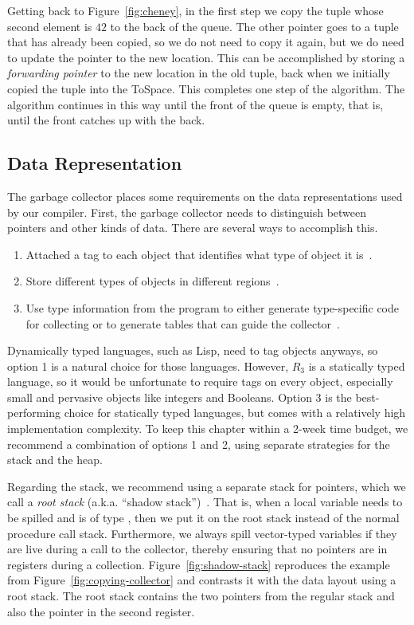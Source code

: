 \documentclass[11pt]{book}
\begin{document}
Getting back to Figure~\ref{fig:cheney}, in the first step we copy the
tuple whose second element is $42$ to the back of the queue. The other
pointer goes to a tuple that has already been copied, so we do not
need to copy it again, but we do need to update the pointer to the new
location. This can be accomplished by storing a \emph{forwarding
pointer} to the new location in the old tuple, back when we initially
copied the tuple into the ToSpace. This completes one step of the
algorithm. The algorithm continues in this way until the front of the
queue is empty, that is, until the front catches up with the back.


\subsection{Data Representation}
\label{sec:data-rep-gc}

The garbage collector places some requirements on the data
representations used by our compiler. First, the garbage collector
needs to distinguish between pointers and other kinds of data. There
are several ways to accomplish this.
\begin{enumerate}
\item Attached a tag to each object that identifies what type of
  object it is~\citep{McCarthy:1960dz}.
\item Store different types of objects in different
  regions~\citep{Steele:1977ab}.
\item Use type information from the program to either generate
  type-specific code for collecting or to generate tables that can
  guide the
  collector~\citep{Appel:1989aa,Goldberg:1991aa,Diwan:1992aa}.
\end{enumerate}
Dynamically typed languages, such as Lisp, need to tag objects
anyways, so option 1 is a natural choice for those languages.
However, $R_3$ is a statically typed language, so it would be
unfortunate to require tags on every object, especially small and
pervasive objects like integers and Booleans.  Option 3 is the
best-performing choice for statically typed languages, but comes with
a relatively high implementation complexity. To keep this chapter
within a 2-week time budget, we recommend a combination of options 1
and 2, using separate strategies for the stack and the heap.

Regarding the stack, we recommend using a separate stack for pointers,
which we call a \emph{root stack} (a.k.a. ``shadow
stack'')~\citep{Siebert:2001aa,Henderson:2002aa,Baker:2009aa}. That
is, when a local variable needs to be spilled and is of type
, then we put it on the root
stack instead of the normal procedure call stack. Furthermore, we
always spill vector-typed variables if they are live during a call to
the collector, thereby ensuring that no pointers are in registers
during a collection. Figure~\ref{fig:shadow-stack} reproduces the
example from Figure~\ref{fig:copying-collector} and contrasts it with
the data layout using a root stack. The root stack contains the two
pointers from the regular stack and also the pointer in the second
register.
\end{document}
